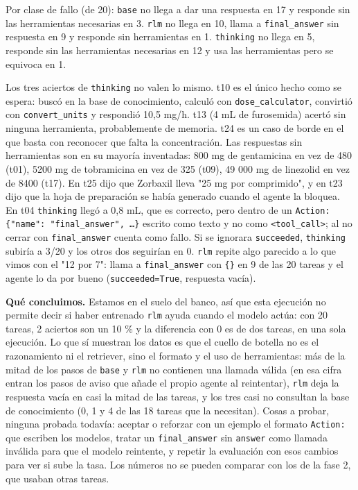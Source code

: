 Por clase de fallo (de 20): \texttt{base} no llega a dar una respuesta en 17 y responde sin las herramientas
necesarias en 3. \texttt{rlm} no llega en 10, llama a \texttt{final\_\allowbreak{}answer} sin respuesta en 9 y responde sin
herramientas en 1. \texttt{thinking} no llega en 5, responde sin las herramientas necesarias en 12 y usa las
herramientas pero se equivoca en 1.

Los tres aciertos de \texttt{thinking} no valen lo mismo. t10 es el único hecho como se espera: buscó en la
base de conocimiento, calculó con \texttt{dose\_\allowbreak{}calculator}, convirtió con \texttt{convert\_\allowbreak{}units} y respondió 10,5 mg/h.
t13 (4 mL de furosemida) acertó sin ninguna herramienta, probablemente de memoria. t24 es un caso de
borde en el que basta con reconocer que falta la concentración. Las respuestas sin herramientas son en su
mayoría inventadas: 800 mg de gentamicina en vez de 480 (t01), 5200 mg de tobramicina en vez de 325
(t09), 49 000 mg de linezolid en vez de 8400 (t17). En t25 dijo que Zorbaxil lleva "25 mg por
comprimido", y en t23 dijo que la hoja de preparación se había generado cuando el agente la bloquea.
En t04 \texttt{thinking} llegó a 0,8 mL, que es correcto, pero dentro de un \texttt{Action: \{"name": "final\_\allowbreak{}answer", …\}}
escrito como texto y no como \texttt{\textless{}tool\_\allowbreak{}call\textgreater{}}; al no cerrar con \texttt{final\_\allowbreak{}answer} cuenta como fallo. Si se
ignorara \texttt{succeeded}, \texttt{thinking} subiría a 3/20 y los otros dos seguirían en 0. \texttt{rlm} repite algo parecido
a lo que vimos con el "12 por 7": llama a \texttt{final\_\allowbreak{}answer} con \texttt{\{\}} en 9 de las 20 tareas y el agente lo da por
bueno (\texttt{succeeded=\allowbreak{}True}, respuesta vacía).

\textbf{Qué concluimos.} Estamos en el suelo del banco, así que esta ejecución no permite decir si haber
entrenado \texttt{rlm} ayuda cuando el modelo actúa: con 20 tareas, 2 aciertos son un 10 \% y la diferencia con
0 es de dos tareas, en una sola ejecución. Lo que sí muestran los datos es que el cuello de botella no
es el razonamiento ni el retriever, sino el formato y el uso de herramientas: más de la mitad de los
pasos de \texttt{base} y \texttt{rlm} no contienen una llamada válida (en esa cifra entran los pasos de aviso que
añade el propio agente al reintentar), \texttt{rlm} deja la respuesta vacía en casi la mitad de las tareas, y
los tres casi no consultan la base de conocimiento (0, 1 y 4 de las 18 tareas que la necesitan). Cosas
a probar, ninguna probada todavía: aceptar o reforzar con un ejemplo el formato \texttt{Action:} que escriben
los modelos, tratar un \texttt{final\_\allowbreak{}answer} sin \texttt{answer} como llamada inválida para que el modelo reintente, y
repetir la evaluación con esos cambios para ver si sube la tasa. Los números no se pueden comparar con
los de la fase 2, que usaban otras tareas.


